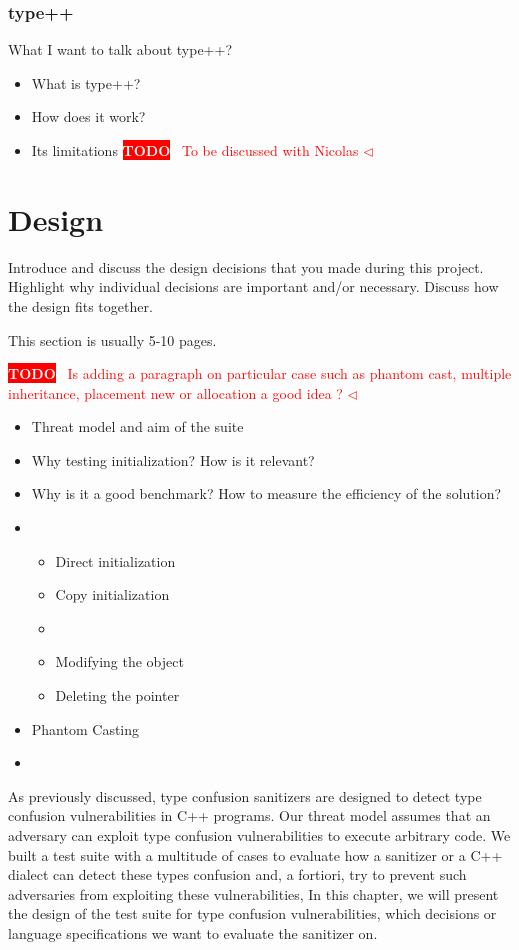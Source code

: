\documentclass[a4paper,11pt,oneside]{report}
\newcommand{\todobox}[3]{%
       \colorbox{#1}{\textcolor{white}{\sffamily\bfseries\scriptsize #2}}%
       ~\textcolor{#1}{#3} %
       \textcolor{#1}{$\triangleleft$}%
}
\newcommand{\adrbqt}[1]{\todobox{red}{TODO}{#1}}
\begin{document}
\subsection{type++}

What I want to talk about type++?
\begin{itemize}
       \item What is type++?
       \item How does it work?
       \item Its limitations \adrbqt{To be discussed with Nicolas}
\end{itemize}


\chapter{Design}

Introduce and discuss the design decisions that you made during this project.
Highlight why individual decisions are important and/or necessary. Discuss
how the design fits together.

This section is usually 5-10 pages.

\adrbqt{Is adding a paragraph on particular case such as phantom cast, multiple inheritance, placement new or allocation a good idea ?}

\begin{itemize}
       \item Threat model and aim of the suite 
       \item Why testing initialization? How is it relevant?
       \item Why is it a good benchmark? How to measure the efficiency of the solution?
       \item \begin{itemize}
              \item Direct initialization
              \item Copy initialization
              \item 
              \item Modifying the object
              \item Deleting the pointer
              \end{itemize}
       \item Phantom Casting
       \item 
\end{itemize}

As previously discussed, type confusion sanitizers are designed to detect type confusion vulnerabilities in C++ programs. 
Our threat model assumes that an adversary can exploit type confusion vulnerabilities to execute arbitrary code. 
We built a test suite with a multitude of cases to evaluate how a sanitizer or a C++ dialect can detect these types confusion and, 
a fortiori, try to prevent such adversaries from exploiting these vulnerabilities,
In this chapter, we will present the design of the test suite for type confusion vulnerabilities, which decisions or 
language specifications we want to evaluate the sanitizer on.
\end{document}

